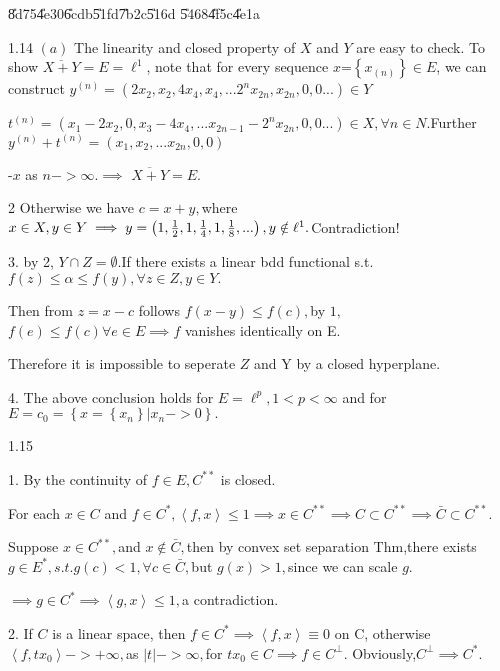 \documentclass{article}
\begin{document}
\U{8d75}\U{4e30}\qquad \U{6cdb}\U{51fd}\U{7b2c}\U{516d}%
\U{5468}\U{4f5c}\U{4e1a}

1.14 $\left( a\right) $ The linearity and closed property of $X$ and $Y$ are
easy to check. To show $\overline{X+Y}=E=\ell ^{1}$, note that for every
sequence $x$=$\left\{ x_{\left( n\right) }\right\} \in E$, we can construct $%
y^{\left( n\right) }=\left(
2x_{2},x_{2},4x_{4},x_{4},...2^{n}x_{2n},x_{2n},0,0...\right) \in Y$

$t^{\left( n\right) }=\left(
x_{1}-2x_{2},0,x_{3}-4x_{4},...x_{2n-1}-2^{n}x_{2n},0,0...\right) \in
X,\forall n\in N.$Further $y^{\left( n\right) }+t^{\left( n\right) }=\left(
x_{1},x_{2},...x_{2n},0,0\right) $

-\TEXTsymbol{>}$x$ as $n->\infty .\implies $ $\overline{X+Y}=E.$

2 Otherwise we have $c=x+y,$where $x\in X,y\in Y\implies y=\left( 1,\frac{1}{%
2},1,\frac{1}{4},1,\frac{1}{8},...\right) ,y\notin \ell ^{1}.$Contradiction!

3. by 2, $Y\cap Z=\emptyset .$If there exists a linear bdd functional s.t. $%
f\left( z\right) \leq \alpha \leq f\left( y\right) ,\forall z\in Z,y\in Y.$

Then from $z=x-c$ follows $f\left( x-y\right) \leq f\left( c\right) ,$by $1,$
$f\left( e\right) \leq f\left( c\right) \forall e\in E\implies f$ vanishes
identically on E.

Therefore it is impossible to seperate $Z$ and Y by a closed hyperplane.

4. The above conclusion holds for $E=\ell ^{p},1<p<\infty $ and for $%
E=c_{0}=\left\{ x=\left\{ x_{n}\right\} |x_{n}->0\right\} .$

1.15

1. By the continuity of $f\in E,C^{\ast \ast }$ is closed.

For each $x\in C$ and $f\in C^{\ast },\left\langle f,x\right\rangle \leq
1\implies x\in C^{\ast \ast }\implies C\subset C^{\ast \ast }\implies \bar{C}%
\subset C^{\ast \ast }.$

Suppose $x\in C^{\ast \ast },$and $x\notin \bar{C},$then by convex set
separation Thm,there exists $g\in E^{\ast },s.t.g\left( c\right) <1,\forall
c\in \bar{C},$but $g\left( x\right) >1,$since we can scale $g.$

$\implies g\in C^{\ast }\implies \left\langle g,x\right\rangle \leq 1,$a
contradiction.

2. If $C$ is a linear space, then $f\in C^{\ast }\implies \left\langle
f,x\right\rangle \equiv 0$ on C, otherwise $\left\langle
f,tx_{0}\right\rangle ->+\infty ,$as $\left\vert t\right\vert ->\infty ,$for 
$tx_{0}\in C\implies f\in C^{\bot }.$ Obviously,$C^{\bot }\implies C^{\ast
}. $
\end{document}
